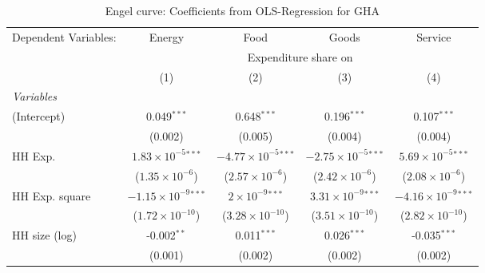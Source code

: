 
\begin{table}[htbp!]
   \centering
   \small
   \begin{adjustbox}{width = 1\textwidth, max height = 0.95\textheight, center}
      \begin{threeparttable}[b]
         \caption{\label{tab:Engel_parametric_GHA} Engel curve: Coefficients from OLS-Regression for GHA}
         \begin{tabular}{lcccc}
            \tabularnewline \midrule \midrule
            Dependent Variables: & Energy                         & Food                           & Goods                          & Service\\  
             & \multicolumn{4}{c}{Expenditure share on} \\ 
                                 & (1)                            & (2)                            & (3)                            & (4)\\  
            \midrule
            \emph{Variables}\\
            (Intercept)          & 0.049$^{***}$                  & 0.648$^{***}$                  & 0.196$^{***}$                  & 0.107$^{***}$\\   
                                 & (0.002)                        & (0.005)                        & (0.004)                        & (0.004)\\   
            HH Exp.              & $1.83\times 10^{-5}$$^{***}$   & $-4.77\times 10^{-5}$$^{***}$  & $-2.75\times 10^{-5}$$^{***}$  & $5.69\times 10^{-5}$$^{***}$\\    
                                 & ($1.35\times 10^{-6}$)         & ($2.57\times 10^{-6}$)         & ($2.42\times 10^{-6}$)         & ($2.08\times 10^{-6}$)\\    
            HH Exp. square       & $-1.15\times 10^{-9}$$^{***}$  & $2\times 10^{-9}$$^{***}$      & $3.31\times 10^{-9}$$^{***}$   & $-4.16\times 10^{-9}$$^{***}$\\    
                                 & ($1.72\times 10^{-10}$)        & ($3.28\times 10^{-10}$)        & ($3.51\times 10^{-10}$)        & ($2.82\times 10^{-10}$)\\    
            HH size (log)        & -0.002$^{**}$                  & 0.011$^{***}$                  & 0.026$^{***}$                  & -0.035$^{***}$\\   
                                 & (0.001)                        & (0.002)                        & (0.002)                        & (0.002)\\   

\end{tabular}
\end{threeparttable}
\end{adjustbox}
\end{table}
